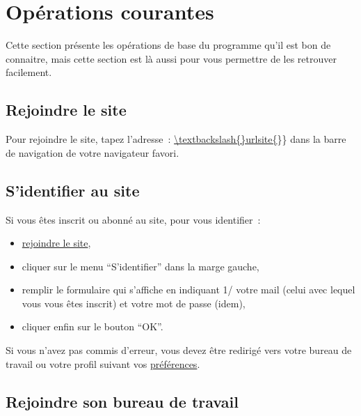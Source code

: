 % 
% 
% 
% 
% 
% 
% 
% 

\chapter{Opérations courantes}\hypertarget{operations-courantes}{}\label{operations-courantes}

Cette section présente les opérations de base du programme \unan{} qu'il est bon de connaitre, mais cette section est là aussi pour vous permettre de les retrouver facilement.

\section{Rejoindre le site}\hypertarget{rejoindre-le-site}{}\label{rejoindre-le-site}

Pour rejoindre le site, tapez l'adresse~{}: \url{\textbackslash{}urlsite\{}\}\} dans la barre de navigation de votre navigateur favori.

\section{S'identifier au site}\hypertarget{vous-identifier}{}\label{vous-identifier}

Si vous êtes inscrit ou abonné au site, pour vous identifier~{}:

\begin{itemize}
\item \hyperlink{rejoindre-le-site}{rejoindre le site},
\item cliquer sur le menu ``S'identifier'' dans la marge gauche,
\item remplir le formulaire qui s'affiche en indiquant 1/ votre mail (celui avec lequel vous vous êtes inscrit) et votre mot de passe (idem),
\item cliquer enfin sur le bouton ``OK''.
\end{itemize}

Si vous n'avez pas commis d'erreur, vous devez être redirigé vers votre bureau de travail ou votre profil suivant vos \hyperlink{preferences-auteur}{préférences}.

\section{Rejoindre son bureau de travail}\hypertarget{rejoindre-bureau-travail}{}\label{rejoindre-bureau-travail}

